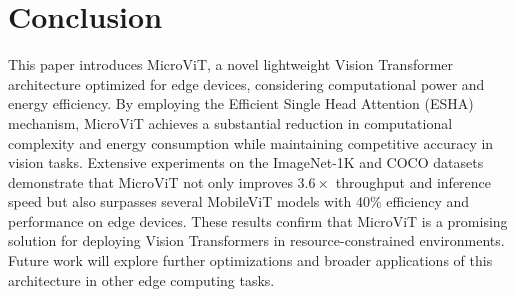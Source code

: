 \section{Conclusion}
This paper introduces MicroViT, a novel lightweight Vision Transformer architecture optimized for edge devices, considering computational power and energy efficiency. By employing the Efficient Single Head Attention (ESHA) mechanism, MicroViT achieves a substantial reduction in computational complexity and energy consumption while maintaining competitive accuracy in vision tasks. Extensive experiments on the ImageNet-1K and COCO datasets demonstrate that MicroViT not only improves $3.6 \times$ throughput and inference speed but also surpasses several MobileViT models with 40\% efficiency and performance on edge devices. These results confirm that MicroViT is a promising solution for deploying Vision Transformers in resource-constrained environments. Future work will explore further optimizations and broader applications of this architecture in other edge computing tasks.
